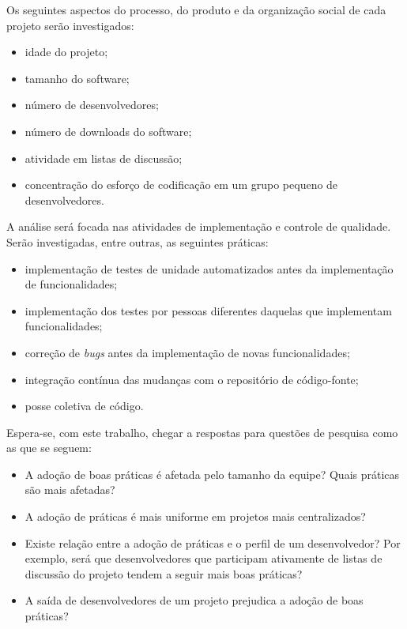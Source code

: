 \documentclass{article}
\begin{document}
Os seguintes aspectos do processo, do produto e da organização social de cada
projeto serão investigados:
\begin{itemize}
  \item idade do projeto;
  \item tamanho do software;
  \item número de desenvolvedores;
  \item número de downloads do software;
  \item atividade em listas de discussão;
  \item concentração do esforço de codificação em um grupo pequeno de
desenvolvedores.
\end{itemize}

A análise será focada nas atividades de implementação e controle de qualidade.
Serão investigadas, entre outras, as seguintes práticas:
\begin{itemize}
  \item implementação de testes de unidade automatizados antes da implementação
  de funcionalidades;
  \item implementação dos testes por pessoas diferentes daquelas que
  implementam funcionalidades;
  \item correção de \emph{bugs} antes da implementação de novas funcionalidades;
  \item integração contínua das mudanças com o repositório de código-fonte;
  \item posse coletiva de código.
\end{itemize}

Espera-se, com este trabalho, chegar a respostas para questões de pesquisa
como as que se seguem:

\begin{itemize}
  \item A adoção de boas práticas é afetada pelo tamanho da equipe? Quais
práticas são mais afetadas?
  \item A adoção de práticas é mais uniforme em projetos mais centralizados?
  \item Existe relação entre a adoção de práticas e o perfil de um
desenvolvedor? Por exemplo, será que desenvolvedores que participam ativamente
de listas de discussão do projeto tendem a seguir mais boas práticas?
  \item A saída de desenvolvedores de um projeto prejudica a adoção de boas
práticas?
\end{itemize}
\end{document}
